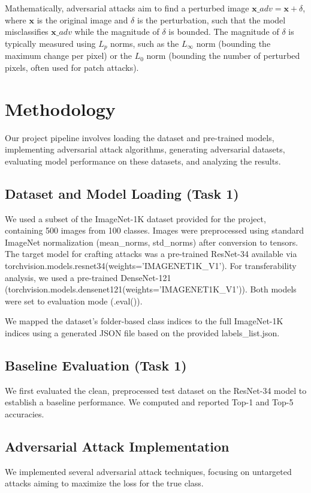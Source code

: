 \documentclass[letterpaper]{article}
\begin{document}
Mathematically, adversarial attacks aim to find a perturbed image $\mathbf{x}\_{adv} = \mathbf{x} + \delta$, where $\mathbf{x}$ is the original image and $\delta$ is the perturbation, such that the model misclassifies $\mathbf{x}\_{adv}$ while the magnitude of $\delta$ is bounded. The magnitude of $\delta$ is typically measured using $L_p$ norms, such as the $L_\infty$ norm (bounding the maximum change per pixel) or the $L_0$ norm (bounding the number of perturbed pixels, often used for patch attacks).

\section{Methodology}

Our project pipeline involves loading the dataset and pre-trained models, implementing adversarial attack algorithms, generating adversarial datasets, evaluating model performance on these datasets, and analyzing the results.

\subsection{Dataset and Model Loading (Task 1)}
We used a subset of the ImageNet-1K dataset provided for the project, containing 500 images from 100 classes. Images were preprocessed using standard ImageNet normalization (mean\_norms, std\_norms) after conversion to tensors.
The target model for crafting attacks was a pre-trained ResNet-34 available via torchvision.models.resnet34(weights='IMAGENET1K\_V1'). For transferability analysis, we used a pre-trained DenseNet-121 (torchvision.models.densenet121(weights='IMAGENET1K\_V1')). Both models were set to evaluation mode (.eval()).

We mapped the dataset's folder-based class indices to the full ImageNet-1K indices using a generated JSON file based on the provided labels\_list.json.

\subsection{Baseline Evaluation (Task 1)}
We first evaluated the clean, preprocessed test dataset on the ResNet-34 model to establish a baseline performance. We computed and reported Top-1 and Top-5 accuracies.

\subsection{Adversarial Attack Implementation}
We implemented several adversarial attack techniques, focusing on untargeted attacks aiming to maximize the loss for the true class.
\end{document}
